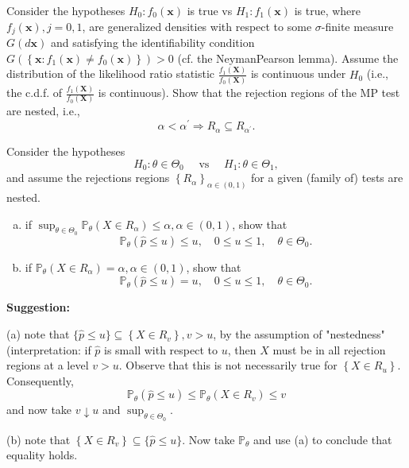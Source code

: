 \begin{ex}
    Consider the hypotheses
    \(H_{0}: f_{0}(\mathbf{x})\) is true vs \(H_{1}: f_{1}(\mathbf{x})\) is true,
    where \(f_{j}(\mathbf{x}), j=0,1\), are generalized densities with respect to some \(\sigma\)-finite measure \(G(d \mathbf{x})\) and satisfying the identifiability condition \(G\left(\left\{\mathbf{x}: f_{1}(\mathbf{x}) \neq f_{0}(\mathbf{x})\right\}\right)>0\) (cf. the NeymanPearson lemma). Assume the distribution of the likelihood ratio statistic \(\frac{f_{1}(\mathbf{X})}{f_{0}(\mathbf{X})}\) is continuous under \(H_{0}\) (i.e., the c.d.f. of \(\frac{f_{1}(\mathbf{X})}{f_{0}(\mathbf{X})}\) is continuous). Show that the rejection regions of the MP test are nested, i.e.,
    \[
        \alpha<\alpha^{\prime} \Rightarrow R_{\alpha} \subseteq R_{\alpha^{\prime}}. 
    \]
\end{ex}

\begin{ex}
    Consider the hypotheses
    \[
        H_{0}: \theta \in \Theta_{0} \quad \text { vs } \quad H_{1}: \theta \in \Theta_{1}, 
    \]
    and assume the rejections regions \(\left\{R_{\alpha}\right\}_{\alpha \in(0,1)}\) for a given (family of) tests are nested. 
    \begin{enumerate}[(a)]
        \item if \(\sup _{\theta \in \Theta_{0}} \mathbb{P}_{\theta}\left(X \in R_{\alpha}\right) \leq \alpha, \alpha \in(0,1)\), show that
        \[
            \mathbb{P}_{\theta}(\widehat{p} \leq u) \leq u, \quad 0 \leq u \leq 1, \quad \theta \in \Theta_{0}. 
        \]
        \item if \(\mathbb{P}_{\theta}\left(X \in R_{\alpha}\right)=\alpha, \alpha \in(0,1)\), show that
        \[
            \mathbb{P}_{\theta}(\widehat{p} \leq u)=u, \quad 0 \leq u \leq 1, \quad \theta \in \Theta_{0}. 
        \]
    \end{enumerate}
    {\bfseries Suggestion: }

    (a) note that \(\{\widehat{p} \leq u\} \subseteq\left\{X \in R_{v}\right\}, v>u\), by the assumption of "nestedness" (interpretation: if \(\widehat{p}\) is small with respect to \(u\), then \(X\) must be in all rejection regions at a level \(v>u\). Observe that this is not necessarily true for \(\left\{X \in R_{u}\right\}\). Consequently,
    \[
    \mathbb{P}_{\theta}(\widehat{p} \leq u) \leq \mathbb{P}_{\theta}\left(X \in R_{v}\right) \leq v
    \]
    and now take \(v \downarrow u\) and \(\sup _{\theta \in \Theta_{0}}\). 

    (b) note that \(\left\{X \in R_{v}\right\} \subseteq\{\widehat{p} \leq u\}\). Now take \(\mathbb{P}_{\theta}\) and use (a) to conclude that equality holds. 
\end{ex}


